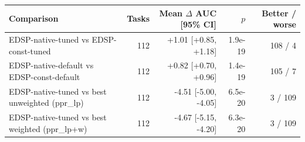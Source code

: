 \begin{tabular}{lrrrr}
\toprule
Comparison & Tasks & Mean $\Delta$ AUC [95\% CI] & $p$ & Better / worse \\
\midrule
EDSP-native-tuned vs EDSP-const-tuned & 112 & +1.01 [+0.85, +1.18] & 1.9e-19 & 108 / 4 \\
EDSP-native-default vs EDSP-const-default & 112 & +0.82 [+0.70, +0.96] & 1.4e-19 & 105 / 7 \\
EDSP-native-tuned vs best unweighted (ppr_lp) & 112 & -4.51 [-5.00, -4.05] & 6.5e-20 & 3 / 109 \\
EDSP-native-tuned vs best weighted (ppr_lp+w) & 112 & -4.67 [-5.15, -4.20] & 6.3e-20 & 3 / 109 \\
\bottomrule
\end{tabular}
